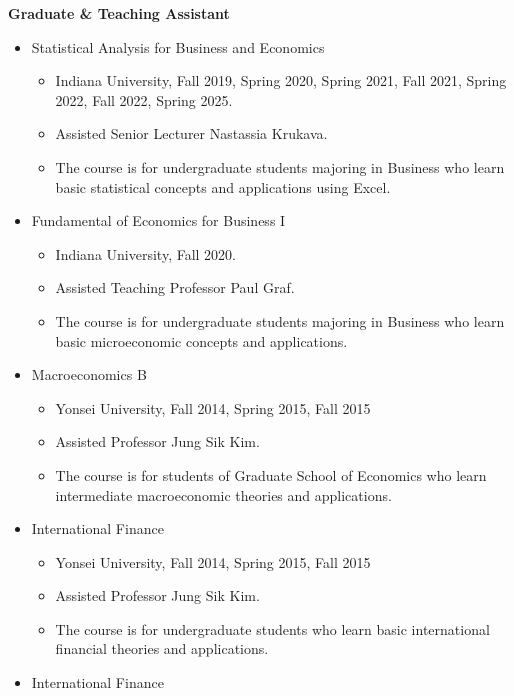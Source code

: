 \documentclass[11pt,a4paper]{article}
\begin{document}
\vspace{5mm}
\textbf{Graduate \& Teaching Assistant} 
\begin{itemize}[leftmargin=*]   
\item Statistical Analysis for Business and Economics
    \begin{itemize}[leftmargin=*]
        \item Indiana University, Fall 2019, Spring 2020, Spring 2021, Fall 2021, Spring 2022, Fall 2022, Spring 2025.
        \item Assisted Senior Lecturer Nastassia Krukava.
        \item The course is for undergraduate students majoring in Business who learn basic statistical concepts and applications using Excel.
    \end{itemize}    
\item Fundamental of Economics for Business I
    \begin{itemize}[leftmargin=*]
        \item Indiana University, Fall 2020.
        \item Assisted Teaching Professor Paul Graf.
        \item The course is for undergraduate students majoring in Business who learn basic microeconomic concepts and applications.
    \end{itemize}    
\item Macroeconomics B
    \begin{itemize}[leftmargin=*]
        \item Yonsei University, Fall 2014, Spring 2015, Fall 2015
        \item Assisted Professor Jung Sik Kim.
        \item The course is for students of Graduate School of Economics who learn intermediate macroeconomic theories and applications.
    \end{itemize}
\item International Finance
    \begin{itemize}[leftmargin=*]
        \item Yonsei University, Fall 2014, Spring 2015, Fall 2015
        \item Assisted Professor Jung Sik Kim.
        \item The course is for undergraduate students who learn basic international financial theories and applications.
    \end{itemize}
\item International Finance

\end{itemize}
\end{document}

